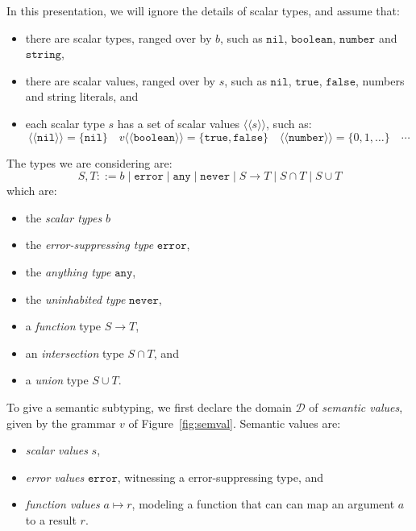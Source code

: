 \documentclass[acmsmall,review,screen]{acmart}
\newcommand{\NEVER}{\mathtt{never}}
\newcommand{\ANY}{\mathtt{any}}
\newcommand{\ERROR}{\mathtt{error}}
\newcommand{\NIL}{\mathtt{nil}}
\newcommand{\TRUE}{\mathtt{true}}
\newcommand{\FALSE}{\mathtt{false}}
\newcommand{\BOOLEAN}{\mathtt{boolean}}
\newcommand{\NUMBER}{\mathtt{number}}
\newcommand{\STRING}{\mathtt{string}}
\newcommand{\fun}{\mathbin{\rightarrow}}
\newcommand{\ssem}[1]{\langle\!\langle{#1}\rangle\!\rangle}
\begin{document}
In this presentation, we will ignore the details of scalar types,
and assume that:
\begin{itemize}

\item there are scalar types, ranged over by $b$,
  such as $\NIL$, $\BOOLEAN$, $\NUMBER$ and $\STRING$,
  
\item there are scalar values, ranged over by $s$,
  such as $\NIL$, $\TRUE$, $\FALSE$, numbers and string literals, and

\item each scalar type $s$ has a set of scalar values $\ssem{s}$, such as:
  \[
    \ssem{\NIL} = \{ \NIL \} \quad
v    \ssem{\BOOLEAN} = \{ \TRUE, \FALSE \} \quad
    \ssem{\NUMBER} = \{ 0, 1, \dots \} \quad \cdots
  \]
  
\end{itemize}
The types we are considering are:
\[
S, T ::= b \mid \ERROR \mid \ANY \mid \NEVER \mid S \fun T \mid S \cap T \mid S \cup T
\]
which are:
\begin{itemize}

\item the \emph{scalar types} $b$
  
\item the \emph{error-suppressing type} $\ERROR$,

\item the \emph{anything type} $\ANY$,

\item the \emph{uninhabited type} $\NEVER$,

\item a \emph{function} type $S \fun T$,

\item an \emph{intersection} type $S \cap T$, and

\item a \emph{union} type $S \cup T$.

\end{itemize}
To give a semantic subtyping, we first declare the domain $\mathcal{D}$
of \emph{semantic values}, given by the grammar $v$ of Figure~\ref{fig:semval}.
Semantic values are:
\begin{itemize}
  
\item \emph{scalar values} $s$,

\item \emph{error values} $\ERROR$,
  witnessing a error-suppressing type,
  and

\item \emph{function values} $a \mapsto r$,
  modeling a function that can can map an argument $a$ to
  a result $r$.

\end{itemize}
\end{document}
